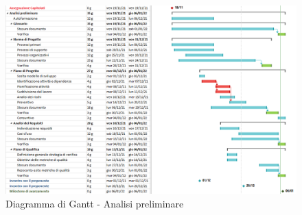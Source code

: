 
\begin{figure}[H]
  \centering
   \includegraphics[scale=0.58]{immagini/analisi_preliminare.png}
   \caption{Diagramma di Gantt - Analisi preliminare}
 \end{figure}
 \pagebreak

